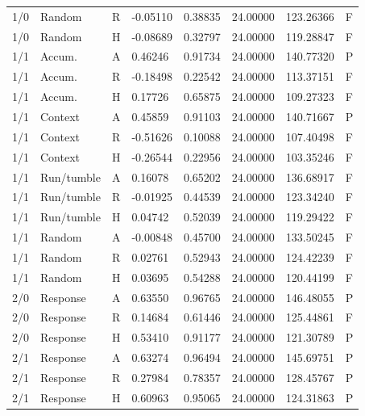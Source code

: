 \begin{longtable}{llllllll}
1/0 & Random & R & -0.05110 & 0.38835 & 24.00000 & 123.26366 & F \\
1/0 & Random & H & -0.08689 & 0.32797 & 24.00000 & 119.28847 & F \\
1/1 & Accum. & A & 0.46246 & 0.91734 & 24.00000 & 140.77320 & P \\
1/1 & Accum. & R & -0.18498 & 0.22542 & 24.00000 & 113.37151 & F \\
1/1 & Accum. & H & 0.17726 & 0.65875 & 24.00000 & 109.27323 & F \\
1/1 & Context & A & 0.45859 & 0.91103 & 24.00000 & 140.71667 & P \\
1/1 & Context & R & -0.51626 & 0.10088 & 24.00000 & 107.40498 & F \\
1/1 & Context & H & -0.26544 & 0.22956 & 24.00000 & 103.35246 & F \\
1/1 & Run/tumble & A & 0.16078 & 0.65202 & 24.00000 & 136.68917 & F \\
1/1 & Run/tumble & R & -0.01925 & 0.44539 & 24.00000 & 123.34240 & F \\
1/1 & Run/tumble & H & 0.04742 & 0.52039 & 24.00000 & 119.29422 & F \\
1/1 & Random & A & -0.00848 & 0.45700 & 24.00000 & 133.50245 & F \\
1/1 & Random & R & 0.02761 & 0.52943 & 24.00000 & 124.42239 & F \\
1/1 & Random & H & 0.03695 & 0.54288 & 24.00000 & 120.44199 & F \\
2/0 & Response & A & 0.63550 & 0.96765 & 24.00000 & 146.48055 & P \\
2/0 & Response & R & 0.14684 & 0.61446 & 24.00000 & 125.44861 & F \\
2/0 & Response & H & 0.53410 & 0.91177 & 24.00000 & 121.30789 & P \\
2/1 & Response & A & 0.63274 & 0.96494 & 24.00000 & 145.69751 & P \\
2/1 & Response & R & 0.27984 & 0.78357 & 24.00000 & 128.45767 & P \\
2/1 & Response & H & 0.60963 & 0.95065 & 24.00000 & 124.31863 & P \\
\bottomrule
\end{longtable}
